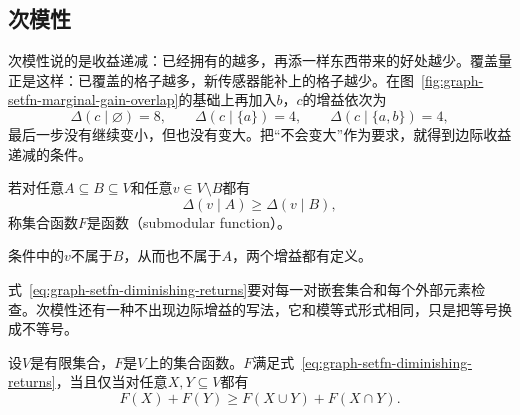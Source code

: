 \subsection{次模性}
\label{sec:graph-setfn-submodularity}

次模性说的是收益递减：已经拥有的越多，再添一样东西带来的好处越少。覆盖量正是这样：已覆盖的格子越多，新传感器能补上的格子越少。在图~\ref{fig:graph-setfn-marginal-gain-overlap}的基础上再加入$b$，$c$的增益依次为
\[
  \Delta(c\mid\varnothing)=8,\qquad \Delta(c\mid\{a\})=4,\qquad \Delta(c\mid\{a,b\})=4,
\]
最后一步没有继续变小，但也没有变大。把“不会变大”作为要求，就得到边际收益递减的条件。

\begin{definition}[次模函数]
\label{def:graph-setfn-submodular}
若对任意$A\subseteq B\subseteq V$和任意$v\in V\setminus B$都有
\begin{equation}
  \Delta(v\mid A)\geq\Delta(v\mid B),
  \label{eq:graph-setfn-diminishing-returns}
\end{equation}
称集合函数$F$是函数（submodular function）。
\end{definition}

条件中的$v$不属于$B$，从而也不属于$A$，两个增益都有定义。

式~\eqref{eq:graph-setfn-diminishing-returns}要对每一对嵌套集合和每个外部元素检查。次模性还有一种不出现边际增益的写法，它和模等式形式相同，只是把等号换成不等号。

\begin{theorem}[次模性的两种刻画]
\label{thm:graph-setfn-submodular-equivalence}
设$V$是有限集合，$F$是$V$上的集合函数。$F$满足式~\eqref{eq:graph-setfn-diminishing-returns}，当且仅当对任意$X,Y\subseteq V$都有
\begin{equation}
  F(X)+F(Y)\geq F(X\cup Y)+F(X\cap Y).
  \label{eq:graph-setfn-submodular-inequality}
\end{equation}
\end{theorem}

